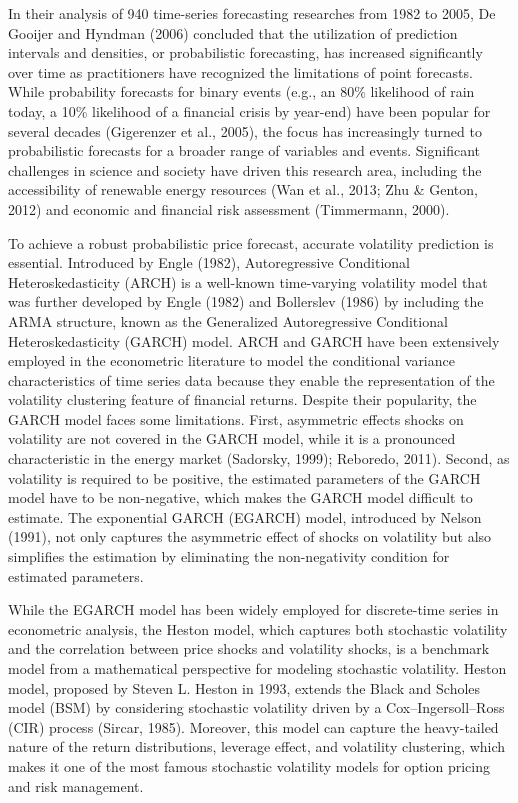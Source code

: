 \documentclass[12pt,a4paper]{article}
\numberwithin{equation}{section}
\begin{document}
In their analysis of 940 time-series forecasting researches from 1982 to 2005, De Gooijer and Hyndman (2006) concluded that the utilization of prediction intervals and densities, or probabilistic forecasting, has increased significantly over time as practitioners have recognized the limitations of point forecasts. While probability forecasts for binary events (e.g., an 80\% likelihood of rain today, a 10\% likelihood of a financial crisis by year-end) have been popular for several decades (Gigerenzer et al., 2005), the focus has increasingly turned to probabilistic forecasts for a broader range of variables and events. Significant challenges in science and society have driven this research area, including the accessibility of renewable energy resources (Wan et al., 2013; Zhu \& Genton, 2012) and economic and financial risk assessment (Timmermann, 2000). 

To achieve a robust probabilistic price forecast, accurate volatility prediction is essential. Introduced by Engle (1982), Autoregressive Conditional Heteroskedasticity (ARCH) is a well-known time-varying volatility model that was further developed by Engle (1982) and Bollerslev (1986) by including the ARMA structure, known as the Generalized Autoregressive Conditional Heteroskedasticity (GARCH) model. ARCH and GARCH have been extensively employed in the econometric literature to model the conditional variance characteristics of time series data because they enable the representation of the volatility clustering feature of financial returns. Despite their popularity, the GARCH model faces some limitations. First, asymmetric eﬀects shocks on volatility are not covered in the GARCH model, while it is a pronounced characteristic in the energy market (Sadorsky, 1999); Reboredo, 2011). Second, as volatility is required to be positive, the estimated parameters of the GARCH model have to be non-negative, which makes the GARCH model difficult to estimate. The exponential GARCH (EGARCH) model, introduced by Nelson (1991), not only captures the asymmetric eﬀect of shocks on volatility but also simplifies the estimation by eliminating the non-negativity condition for estimated parameters.

While the EGARCH model has been widely employed for discrete-time series in econometric analysis, the Heston model, which captures both stochastic volatility and the correlation between price shocks and volatility shocks, is a benchmark model from a mathematical perspective for modeling stochastic volatility. Heston model, proposed by Steven L. Heston in 1993, extends the Black and Scholes model (BSM) by considering stochastic volatility driven by a Cox–Ingersoll–Ross (CIR) process (Sircar, 1985). Moreover, this model can capture the heavy-tailed nature of the return distributions, leverage effect, and volatility clustering, which makes it one of the most famous stochastic volatility models for option pricing and risk management.
\end{document}
